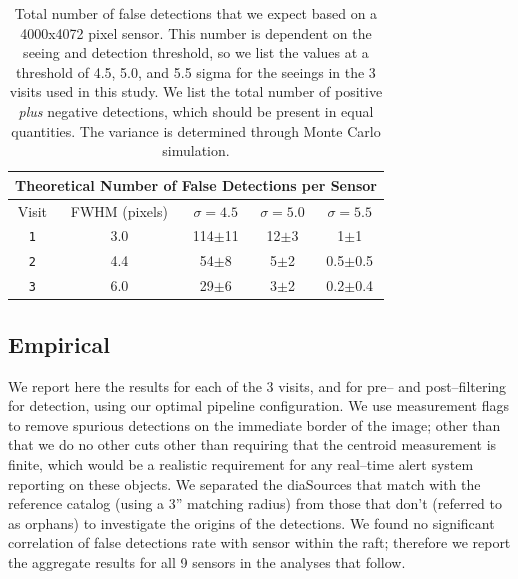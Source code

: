 \documentclass[floatfix, apj]{emulateapj}
\begin{document}
\begin{table}[t]
\centering
\begin{tabular}{ccccc}
\hline
\multicolumn{5}{|c|}{Theoretical Number of False Detections per Sensor} \\
\hline
Visit    & FWHM (pixels) & $\sigma=4.5$ & $\sigma=5.0$ & $\sigma=5.5$\\
\hline
{\tt 1} & 3.0 & 114$\pm$11 & 12$\pm$3& 1$\pm$1\\
{\tt 2} & 4.4 & 54$\pm$8 & 5$\pm$2& 0.5$\pm$0.5\\
{\tt 3} & 6.0 & 29$\pm$6 & 3$\pm$2&0.2$\pm$0.4\\
\end{tabular}
\caption{{\rm Total number of false detections that we expect based on a
  4000x4072 pixel sensor.  This number is dependent on the seeing and
  detection threshold, so we list the values at a threshold of 4.5,
  5.0, and 5.5 sigma for the seeings in the 3 visits used in this
  study.  We list the total number of positive {\it plus} negative
  detections, which should be present in equal quantities. The variance
  is determined through Monte Carlo simulation.\label{tab-fp}}}
\end{table}

\subsection{Empirical}

We report here the results for each of the 3 visits, and for pre-- and post--filtering for detection, using our optimal pipeline configuration.
We use measurement flags to remove spurious detections on the immediate border of the image; other than that we do no other cuts other than requiring that the centroid measurement is finite, which would be a realistic requirement for any real--time alert system reporting on these objects.
We separated the diaSources that match with the reference catalog (using a 3'' matching radius) from those that don't (referred to as orphans) to investigate the origins of the detections.
We found no significant correlation of false detections rate with sensor within the raft; therefore we report the aggregate results for all 9 sensors in the analyses that follow.
\end{document}
